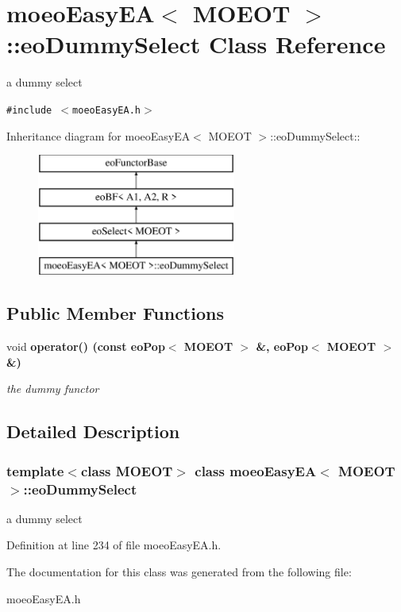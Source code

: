 \section{moeo\-Easy\-EA$<$ MOEOT $>$::eo\-Dummy\-Select Class Reference}
\label{classmoeoEasyEA_1_1eoDummySelect}
a dummy select  


{\tt \#include $<$moeo\-Easy\-EA.h$>$}

Inheritance diagram for moeo\-Easy\-EA$<$ MOEOT $>$::eo\-Dummy\-Select::\begin{figure}[H]
\begin{center}
\leavevmode
\includegraphics[height=4cm]{classmoeoEasyEA_1_1eoDummySelect}
\end{center}
\end{figure}
\subsection*{Public Member Functions}
\begin{CompactItemize}
\item 
void \bf{operator()} (const \bf{eo\-Pop}$<$ MOEOT $>$ \&, \bf{eo\-Pop}$<$ MOEOT $>$ \&)\label{classmoeoEasyEA_1_1eoDummySelect_32207d2ed997aa90ba9f32f5625b63d6}

\begin{CompactList}\small\item\em the dummy functor \item\end{CompactList}\end{CompactItemize}


\subsection{Detailed Description}
\subsubsection*{template$<$class MOEOT$>$ class moeo\-Easy\-EA$<$ MOEOT $>$::eo\-Dummy\-Select}

a dummy select 



Definition at line 234 of file moeo\-Easy\-EA.h.

The documentation for this class was generated from the following file:\begin{CompactItemize}
\item 
moeo\-Easy\-EA.h\end{CompactItemize}
